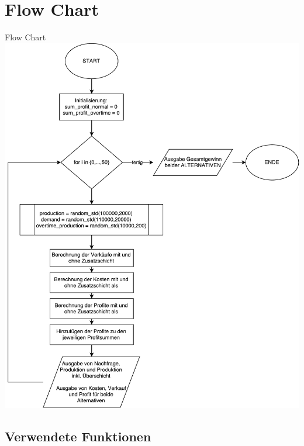 \section{Flow Chart}
\begin{frame}{Flow Chart}
	\centering
  	\includegraphics[scale=0.25]{BSP19_Flow_Chart.pdf}
\end{frame}

\subsection{Verwendete Funktionen}
%
%
%



